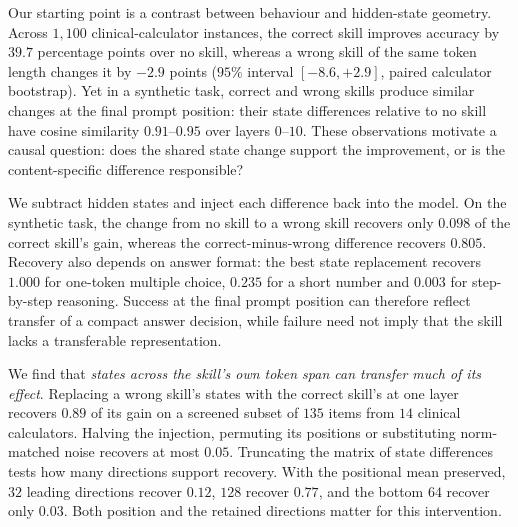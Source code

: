 \documentclass{article}
\begin{document}
Our starting point is a contrast between behaviour and hidden-state geometry.
Across $1{,}100$ clinical-calculator instances, the correct skill improves
accuracy by $39.7$ percentage points over no skill, whereas a wrong skill of
the same token length changes it by $-2.9$ points ($95\%$ interval
$[-8.6,+2.9]$, paired calculator bootstrap). Yet in a synthetic task, correct and wrong skills produce
similar changes at the final prompt position: their state differences relative
to no skill have cosine similarity $0.91$--$0.95$ over layers $0$--$10$.
These observations motivate a causal question: does the shared state change
support the improvement, or is the content-specific difference responsible?

We subtract hidden states and inject each difference back into the model. On
the synthetic task, the change from no skill to a wrong skill recovers only
$0.098$ of the correct skill's gain, whereas the correct-minus-wrong difference
recovers $0.805$. Recovery also depends on answer format: the best state
replacement recovers $1.000$ for one-token multiple choice, $0.235$ for a short
number and $0.003$ for step-by-step reasoning. Success at the final prompt
position can therefore reflect transfer of a compact answer decision, while
failure need not imply that the skill lacks a transferable representation.

We find that \emph{states across the skill's own token span can transfer much
of its effect}. Replacing a wrong skill's states with the correct skill's at
one layer recovers $0.89$ of its gain on a screened subset of $135$ items from
$14$ clinical calculators. Halving the injection, permuting its positions or
substituting norm-matched noise recovers at most $0.05$. Truncating the matrix
of state differences tests how many directions support recovery. With the
positional mean preserved, $32$ leading directions recover $0.12$, $128$
recover $0.77$, and the bottom $64$ recover only $0.03$. Both position and the
retained directions matter for this intervention.
\end{document}
